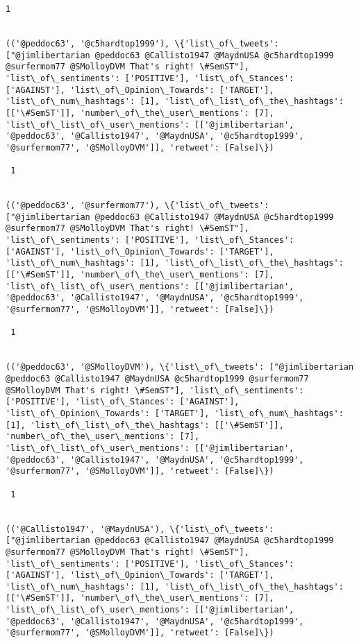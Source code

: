 \documentclass[11pt]{article}
\begin{document}
\begin{Verbatim}[commandchars=\\\{\}]
 1
 

(('@peddoc63', '@c5hardtop1999'), \{'list\_of\_tweets': ["@jimlibertarian @peddoc63 @Callisto1947 @MaydnUSA @c5hardtop1999 @surfermom77 @SMolloyDVM That's right! \#SemST"], 'list\_of\_sentiments': ['POSITIVE'], 'list\_of\_Stances': ['AGAINST'], 'list\_of\_Opinion\_Towards': ['TARGET'], 'list\_of\_num\_hashtags': [1], 'list\_of\_list\_of\_the\_hashtags': [['\#SemST']], 'number\_of\_the\_user\_mentions': [7], 'list\_of\_list\_of\_user\_mentions': [['@jimlibertarian', '@peddoc63', '@Callisto1947', '@MaydnUSA', '@c5hardtop1999', '@surfermom77', '@SMolloyDVM']], 'retweet': [False]\})

 1
 

(('@peddoc63', '@surfermom77'), \{'list\_of\_tweets': ["@jimlibertarian @peddoc63 @Callisto1947 @MaydnUSA @c5hardtop1999 @surfermom77 @SMolloyDVM That's right! \#SemST"], 'list\_of\_sentiments': ['POSITIVE'], 'list\_of\_Stances': ['AGAINST'], 'list\_of\_Opinion\_Towards': ['TARGET'], 'list\_of\_num\_hashtags': [1], 'list\_of\_list\_of\_the\_hashtags': [['\#SemST']], 'number\_of\_the\_user\_mentions': [7], 'list\_of\_list\_of\_user\_mentions': [['@jimlibertarian', '@peddoc63', '@Callisto1947', '@MaydnUSA', '@c5hardtop1999', '@surfermom77', '@SMolloyDVM']], 'retweet': [False]\})

 1
 

(('@peddoc63', '@SMolloyDVM'), \{'list\_of\_tweets': ["@jimlibertarian @peddoc63 @Callisto1947 @MaydnUSA @c5hardtop1999 @surfermom77 @SMolloyDVM That's right! \#SemST"], 'list\_of\_sentiments': ['POSITIVE'], 'list\_of\_Stances': ['AGAINST'], 'list\_of\_Opinion\_Towards': ['TARGET'], 'list\_of\_num\_hashtags': [1], 'list\_of\_list\_of\_the\_hashtags': [['\#SemST']], 'number\_of\_the\_user\_mentions': [7], 'list\_of\_list\_of\_user\_mentions': [['@jimlibertarian', '@peddoc63', '@Callisto1947', '@MaydnUSA', '@c5hardtop1999', '@surfermom77', '@SMolloyDVM']], 'retweet': [False]\})

 1
 

(('@Callisto1947', '@MaydnUSA'), \{'list\_of\_tweets': ["@jimlibertarian @peddoc63 @Callisto1947 @MaydnUSA @c5hardtop1999 @surfermom77 @SMolloyDVM That's right! \#SemST"], 'list\_of\_sentiments': ['POSITIVE'], 'list\_of\_Stances': ['AGAINST'], 'list\_of\_Opinion\_Towards': ['TARGET'], 'list\_of\_num\_hashtags': [1], 'list\_of\_list\_of\_the\_hashtags': [['\#SemST']], 'number\_of\_the\_user\_mentions': [7], 'list\_of\_list\_of\_user\_mentions': [['@jimlibertarian', '@peddoc63', '@Callisto1947', '@MaydnUSA', '@c5hardtop1999', '@surfermom77', '@SMolloyDVM']], 'retweet': [False]\})


\end{Verbatim}
\end{document}
